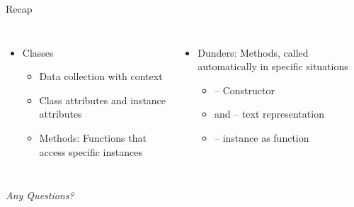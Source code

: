 
\begin{frame}[t,plain]
\titlepage
\end{frame}


\begin{frame}{Recap}
%
\begin{columns}[T]
\begin{itemize}
\item Classes
	\begin{itemize}
	\item Data collection with context
	\item Class attributes and instance attributes
	\item Methods: Functions that access specific instances
	\end{itemize}
\end{itemize}
%
\begin{itemize}
\item Dunders: Methods, called automatically in specific situations
	\begin{itemize}
	\item {} -- Constructor
	\item {} and  -- text representation
	\item {} -- instance as function
	\end{itemize}
\end{itemize}

\end{columns}
%
\begin{center}
	\emph{Any Questions?}
\end{center}
%
\end{frame}


